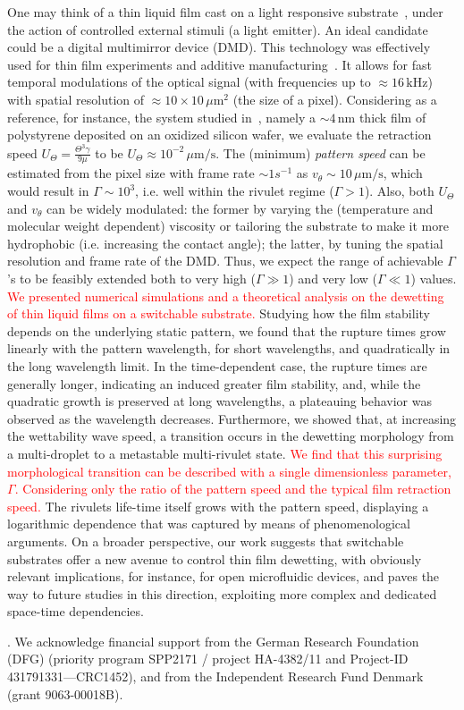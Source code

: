 \documentclass[amsmath,amssymb,showpacs,prf,superscriptaddress, longbibliography]{revtex4-1} %
\newcommand{\REV}[1]{\textcolor{red}{#1}}
\begin{document}
One may think of a thin liquid film cast on a light responsive substrate~\cite{ichimuraLightDrivenMotionLiquids2000}, under the action of controlled external stimuli (a light emitter). 
An ideal candidate could be a digital multimirror device (DMD).
This technology was effectively used for thin film experiments and additive manufacturing~\cite{vieyrasalasActiveControlEvaporative2012, sahaScalableSubmicrometerAdditive2019}. 
It allows for fast temporal modulations of the optical signal (with frequencies up to $\approx 16 \, \text{kHz}$) with spatial resolution of $\approx 10 \times 10 \, \mu \text{m}^2$ (the size of a pixel).
Considering as a reference, for instance, the system studied in~\cite{beckerComplexDewettingScenarios2003,fetzerThermalNoiseInfluences2007}, namely a $\sim 4 \, \text{nm}$ thick film of polystyrene deposited on an oxidized silicon wafer, we evaluate the retraction speed $U_{\Theta} = \frac{\Theta^3 \gamma}{9 \mu}$ to be $U_{\Theta} \approx 10^{-2} \, \mu \text{m}/\text{s}$. 
The (minimum) {\it pattern speed} can be estimated from the pixel size with frame rate $\sim 1 s^{-1}$ as $v_{\theta} \sim 10 \, \mu \text{m}/\text{s}$, which would result in $\Gamma \sim 10^3$, i.e. well within the rivulet regime ($\Gamma > 1$). 
Also, both $U_{\Theta}$ and $v_{\theta}$ can be widely modulated: the former by varying the (temperature and molecular weight dependent) viscosity or tailoring the substrate to make it more hydrophobic (i.e. increasing the contact angle); the latter, by tuning the spatial resolution and frame rate of the DMD. 
Thus, we expect the range of achievable $\Gamma$'s to be feasibly extended both to very high ($\Gamma \gg 1$) and very low ($\Gamma \ll 1$) values.\\
\REV{We presented numerical simulations and a theoretical analysis on the dewetting of thin liquid films on a switchable substrate.}
Studying how the film stability depends on the underlying static pattern, we found that the rupture times grow linearly with the pattern wavelength, for short wavelengths, and quadratically in the long wavelength limit. 
In the time-dependent case, the rupture times are generally longer, indicating an induced greater film stability, and, while the quadratic growth is preserved at long wavelengths, a plateauing behavior was observed as the wavelength decreases. 
Furthermore, we showed that, at increasing the wettability wave speed, a transition occurs in the dewetting morphology from a multi-droplet to a metastable multi-rivulet state. 
\REV{We find that this surprising morphological transition can be described with a single dimensionless parameter, $\Gamma$.}
\REV{Considering only the ratio of the pattern speed and the typical film retraction speed.} 
The rivulets life-time itself grows with the pattern speed, displaying a logarithmic dependence that was captured by means of phenomenological arguments.
On a broader perspective, our work suggests that switchable substrates offer a new avenue to control thin film dewetting, with obviously relevant implications, for instance, for open microfluidic devices, and paves the way to future studies in this direction, exploiting more complex and dedicated space-time dependencies.

. We acknowledge financial support from the German Research Foundation (DFG) (priority program SPP2171 / project HA-4382/11 and Project-ID 431791331—CRC1452), and from the Independent Research Fund Denmark (grant 9063-00018B). 


\end{document}
